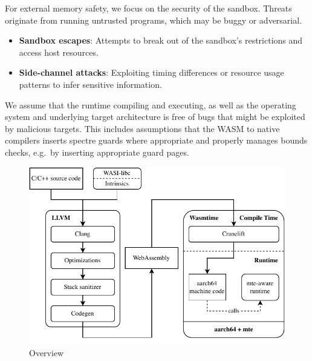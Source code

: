For external memory safety, we focus on the security of the sandbox.
Threats originate from running untrusted programs, which may be buggy or adversarial.

\begin{itemize}
    \item \textbf{Sandbox escapes}: Attempts to break out of the sandbox's restrictions and access host resources.
    \item \textbf{Side-channel attacks}: Exploiting timing differences or resource usage patterns to infer sensitive information.
\end{itemize}


We assume that the runtime compiling and executing, as well as the operating system and underlying target architecture is free of bugs that might be exploited by malicious targets.
This includes assumptions that the WASM to native compilers inserts spectre guards where appropriate and properly manages bounds checks, e.g.\ by inserting appropriate guard pages.


\begin{figure}[t]
    \centering
    \includegraphics{figures/build/overview}
    \caption{Overview}
    \label{fig:overview}
\end{figure}

